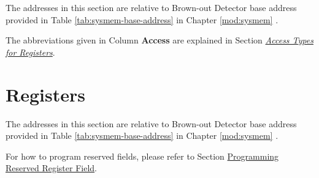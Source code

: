 \documentclass[main\_\_EN.tex]{subfiles}
\begin{document}
The addresses in this section are relative to Brown-out Detector base address provided in Table \ref{tab:sysmem-base-address} in Chapter \ref{mod:sysmem} \textit{}.

The abbreviations given in Column \textbf{Access} are explained in Section \hyperref[glossary-access-types]{\textit{Access Types for Registers}}.






\newpage
\section{Registers}

The addresses in this section are relative to Brown-out Detector base address provided in Table \ref{tab:sysmem-base-address} in Chapter \ref{mod:sysmem} \textit{}.

For how to program reserved fields, please refer to Section \hyperref[programming-reserved-field]{Programming Reserved Register Field}.


\end{document}
